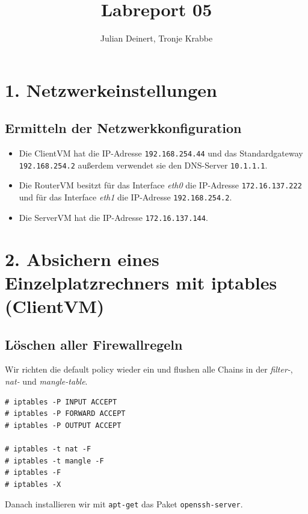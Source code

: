 \documentclass[10pt,a4paper]{article}
\author{Julian Deinert, Tronje Krabbe}
\title{Labreport 05}
\begin{document}
\maketitle
\tableofcontents
\thispagestyle{empty}
\newpage
\setcounter{page}{1}


\section*{1. Netzwerkeinstellungen }
\setcounter{subsection}{1}

\subsection{Ermitteln der Netzwerkkonfiguration}
\begin{itemize}
\item Die ClientVM hat die IP-Adresse \texttt{192.168.254.44} und das Standardgateway \texttt{192.168.254.2} außerdem verwendet sie den DNS-Server \texttt{10.1.1.1}.

\item Die RouterVM besitzt für das Interface \textit{eth0} die IP-Adresse \texttt{172.16.137.222} und für das Interface \textit{eth1} die IP-Adresse \texttt{192.168.254.2}.

\item Die ServerVM hat die IP-Adresse \texttt{172.16.137.144}.
\end{itemize}

\setcounter{section}{2}
\section*{2. Absichern eines Einzelplatzrechners mit iptables (ClientVM)}
\setcounter{subsection}{0}
\subsection{Löschen aller Firewallregeln}

Wir richten die default policy wieder ein und flushen alle Chains  in der \textit{filter-}, \textit{nat-} und \textit{mangle-table}.
\begin{verbatim}
# iptables -P INPUT ACCEPT
# iptables -P FORWARD ACCEPT
# iptables -P OUTPUT ACCEPT

# iptables -t nat -F
# iptables -t mangle -F
# iptables -F
# iptables -X
\end{verbatim}
Danach installieren wir mit \texttt{apt-get} das Paket \texttt{openssh-server}.
\end{document}
